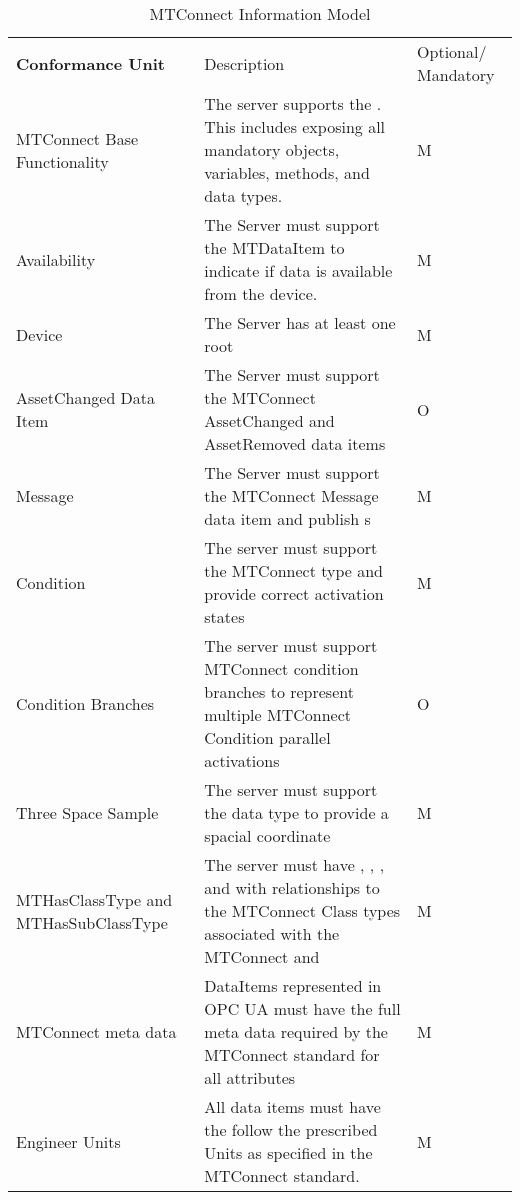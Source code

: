 \begin{table}[ht]
\centering 
  \caption{MTConnect  Information Model}
  \label{table:server-conformance}
\fontsize{9pt}{11pt}\selectfont
\tabulinesep=3pt
\begin{tabu} to 6in {|X[-0.25]|X|X[-0.25]|} \everyrow{\hline}
\hline
\rowfont\bfseries Conformance Unit & Description & Optional/ Mandatory \\
MTConnect Base Functionality & The server supports the . This includes exposing all mandatory objects, variables, methods, and data types. & M \\ 
Availability & The Server must support the  \gls{MTDataItem} to indicate if data is available from the device. & M \\ 
Device & The Server has at least one root  & M \\ 
AssetChanged Data Item & The Server must support the MTConnect AssetChanged and AssetRemoved data items  & O \\ 
Message & The Server must support the MTConnect Message data item and publish  s & M \\ 
Condition & The server must support the MTConnect  type and provide correct activation states  & M \\ 
Condition Branches & The server must support MTConnect  condition branches to represent multiple MTConnect Condition parallel activations & O \\ 
Three Space Sample & The server must support the  data type to provide a spacial coordinate & M \\ 
MTHasClassType and MTHasSubClassType & The server must have ,  , , and  with relationships to the MTConnect Class types associated with the MTConnect   and  & M \\ 
MTConnect meta data & DataItems represented in OPC UA must have the full meta data required by the MTConnect standard for all attributes & M \\ 
Engineer Units & All  data items must have the  follow the prescribed Units as specified in the MTConnect standard.  & M \\ 
\end{tabu}
\end{table}

